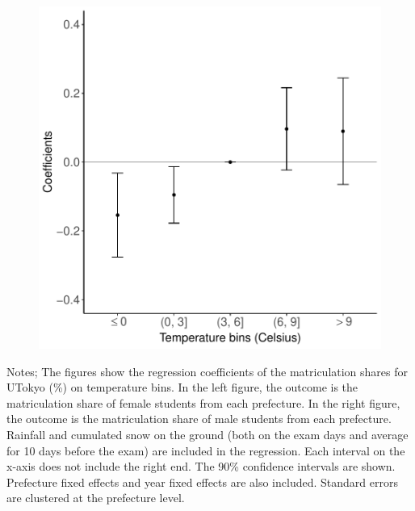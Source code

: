 \documentclass[10pt, pdfmx,hiresbb]{beamer}
\begin{document}
\begin{frame}
\begin{minipage}{0.49\textwidth}
\begin{figure}[h]
      \includegraphics[width = \textwidth]{../Output/images/reg_gender_4.pdf}
      \centering
    \end{figure}
  \end{minipage}
  \tiny
  \begin{tablenotes}
  \item Notes;
    The figures show the regression coefficients of the matriculation shares for UTokyo (\%) on temperature bins.
    In the left figure, the outcome is the matriculation share of female students from each prefecture.
    In the right figure, the outcome is the matriculation share of male students from each prefecture.
    Rainfall and cumulated snow on the ground (both on the exam days and average for 10 days before the exam) are included in the regression.
    Each interval on the x-axis does not include the right end.
    The 90\% confidence intervals are shown.
    Prefecture fixed effects and year fixed effects are also included.
    Standard errors are clustered at the prefecture level.
  \end{tablenotes}
\end{frame}
\end{document}

